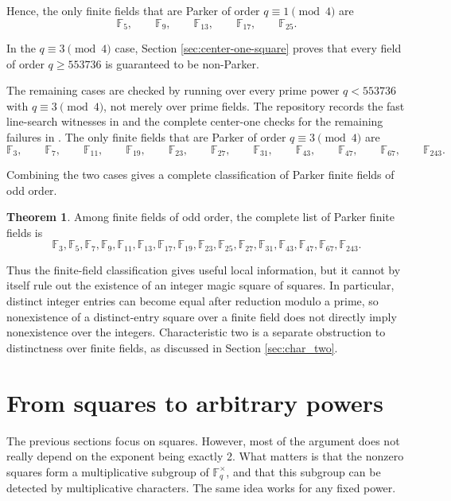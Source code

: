 \documentclass{article}
\newcommand{\F}{\mathbb F}
\theoremstyle{definition}
\newtheorem{theorem}{Theorem}
\numberwithin{equation}{section}
\begin{document}
Hence, the only finite fields that are Parker of order \(q\equiv1\pmod4\) are
\[
\F_5,
\qquad \F_9,
\qquad \F_{13},
\qquad \F_{17},
\qquad \F_{25}.
\]

In the \(q\equiv3\pmod4\) case, Section \ref{sec:center-one-square} proves that every field of order \(q\geq553736\) is guaranteed to be non-Parker.

The remaining cases are checked by running over every prime power \(q<553736\) with \(q\equiv3\pmod4\), not merely over prime fields.  The repository records the fast line-search witnesses in  and the complete center-one checks for the remaining failures in  \cite{magicSquaresFieldsRepo}.  The only finite fields that are Parker of order \(q\equiv3\pmod4\) are
\[
\F_3,
\qquad \F_7,
\qquad \F_{11},
\qquad \F_{19},
\qquad \F_{23},
\qquad \F_{27},
\qquad \F_{31},
\qquad \F_{43},
\qquad \F_{47},
\qquad\F_{67},
\qquad\F_{243}.
\]

Combining the two cases gives a complete classification of Parker finite fields of odd order.

\begin{theorem}
    Among finite fields of odd order, the complete list of Parker finite fields is
    \[
    \boxed{
    \F_3,\F_5,\F_7,\F_9,\F_{11},\F_{13},\F_{17},\F_{19},\F_{23},\F_{25},
    \F_{27},\F_{31},\F_{43},\F_{47},\F_{67},\F_{243}.}
    \]
\end{theorem}

Thus the finite-field classification gives useful local information, but it
cannot by itself rule out the existence of an integer magic square of squares.
In particular, distinct integer entries can become equal after reduction
modulo a prime, so nonexistence of a distinct-entry square over a finite field
does not directly imply nonexistence over the integers. Characteristic two is
a separate obstruction to distinctness over finite fields, as discussed in
Section \ref{sec:char_two}.

\section{From squares to arbitrary powers}

The previous sections focus on squares.  However, most of the argument does not
really depend on the exponent being exactly 2.  What matters is that the nonzero
squares form a multiplicative subgroup of \(\F_q^\times\), and that this subgroup
can be detected by multiplicative characters.  The same idea works for any fixed
power.
\end{document}
